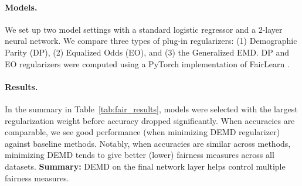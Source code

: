 \paragraph{Models.} We set up two model settings with a standard logistic regressor and a 2-layer neural network. We compare three types of plug-in regularizers: (1) Demographic Parity (DP), (2) Equalized Odds (EO), and (3) the Generalized EMD. DP and EO regularizers were computed using a PyTorch implementation of FairLearn \citep{bird2020fairlearn}. 

\paragraph{Results.} In the summary in Table~\ref{tab:fair_results}, models were selected with the largest regularization weight before accuracy dropped significantly. When accuracies are comparable, we see good performance (when minimizing DEMD regularizer) against baseline methods. Notably, when accuracies are similar across methods, minimizing DEMD tends to give better (lower) fairness measures across all datasets.
{\bf Summary:} DEMD on the final network layer helps control multiple fairness measures.


